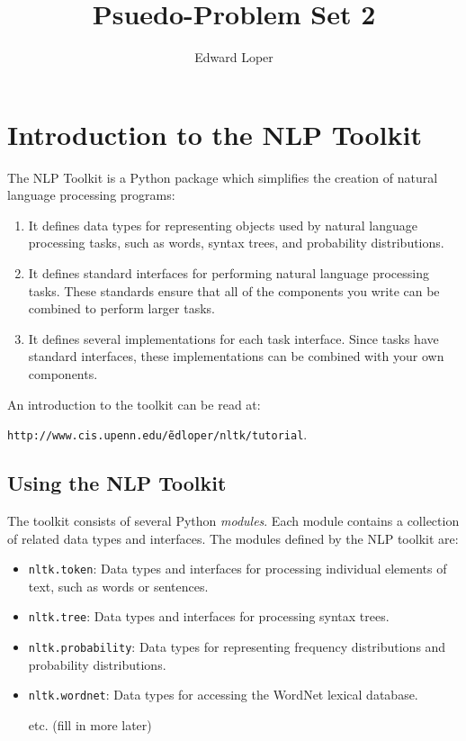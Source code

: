 \documentclass[11pt]{article}
\begin{document}
\title{Psuedo-Problem Set 2}
\author{Edward Loper}
\maketitle

\section{Introduction to the NLP Toolkit}

  The NLP Toolkit is a Python package which simplifies the creation of
  natural language processing programs:

  \begin{enumerate}

    \item It defines data types for representing objects used by
    natural language processing tasks, such as words, syntax trees,
    and probability distributions.

    \item It defines standard interfaces for performing natural
    language processing tasks.  These standards ensure that all of the
    components you write can be combined to perform larger tasks.

    \item It defines several implementations for each task interface.
    Since tasks have standard interfaces, these implementations can be
    combined with your own components.

  \end{enumerate}

  An introduction to the toolkit can be read at:

  \texttt{http://www.cis.upenn.edu/\~edloper/nltk/tutorial}.

\subsection{Using the NLP Toolkit}

  The toolkit consists of several Python \emph{modules}.  Each module
  contains a collection of related data types and interfaces.  The
  modules defined by the NLP toolkit are:

  \begin{itemize}
    \item \texttt{nltk.token}: Data types and interfaces for processing
    individual elements of text, such as words or sentences.

    \item \texttt{nltk.tree}: Data types and interfaces for processing
    syntax trees.

    \item \texttt{nltk.probability}: Data types for representing
    frequency distributions and probability distributions.

    \item \texttt{nltk.wordnet}: Data types for accessing the WordNet
    lexical database.

    \item[etc.] (fill in more later)
  \end{itemize}
\end{document}
